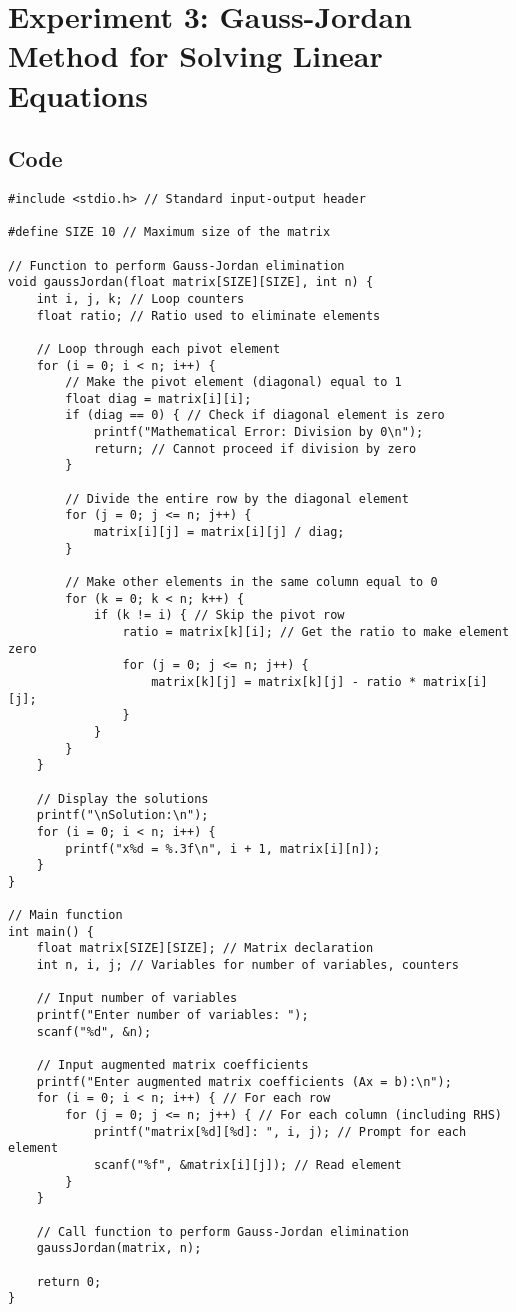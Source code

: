 \documentclass[12pt,a4paper]{article}
\begin{document}
\newpage
\section*{Experiment 3: Gauss-Jordan Method for Solving Linear Equations}





\subsection*{Code}
\begin{lstlisting}
#include <stdio.h> // Standard input-output header

#define SIZE 10 // Maximum size of the matrix

// Function to perform Gauss-Jordan elimination
void gaussJordan(float matrix[SIZE][SIZE], int n) {
    int i, j, k; // Loop counters
    float ratio; // Ratio used to eliminate elements

    // Loop through each pivot element
    for (i = 0; i < n; i++) {
        // Make the pivot element (diagonal) equal to 1
        float diag = matrix[i][i];
        if (diag == 0) { // Check if diagonal element is zero
            printf("Mathematical Error: Division by 0\n");
            return; // Cannot proceed if division by zero
        }

        // Divide the entire row by the diagonal element
        for (j = 0; j <= n; j++) {
            matrix[i][j] = matrix[i][j] / diag;
        }

        // Make other elements in the same column equal to 0
        for (k = 0; k < n; k++) {
            if (k != i) { // Skip the pivot row
                ratio = matrix[k][i]; // Get the ratio to make element zero
                for (j = 0; j <= n; j++) {
                    matrix[k][j] = matrix[k][j] - ratio * matrix[i][j];
                }
            }
        }
    }

    // Display the solutions
    printf("\nSolution:\n");
    for (i = 0; i < n; i++) {
        printf("x%d = %.3f\n", i + 1, matrix[i][n]);
    }
}

// Main function
int main() {
    float matrix[SIZE][SIZE]; // Matrix declaration
    int n, i, j; // Variables for number of variables, counters

    // Input number of variables
    printf("Enter number of variables: ");
    scanf("%d", &n);

    // Input augmented matrix coefficients
    printf("Enter augmented matrix coefficients (Ax = b):\n");
    for (i = 0; i < n; i++) { // For each row
        for (j = 0; j <= n; j++) { // For each column (including RHS)
            printf("matrix[%d][%d]: ", i, j); // Prompt for each element
            scanf("%f", &matrix[i][j]); // Read element
        }
    }

    // Call function to perform Gauss-Jordan elimination
    gaussJordan(matrix, n);

    return 0;
}
\end{lstlisting}
\end{document}
